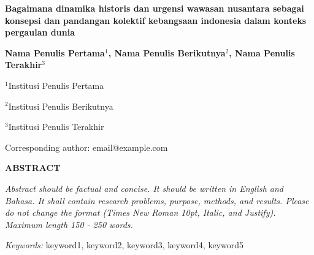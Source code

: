 \documentclass[12pt, a4paper]{article}
\newcommand{\makecustomsectiontitle}[1]{{\centering\normalfont\fontsize{11}{13}\selectfont\bfseries\MakeUppercase{#1}\par}\vspace{1em}\nopagebreak}
\begin{document}
\begin{titlepage}
    \centering
    {\fontsize{16}{19}\bfseries\selectfont Bagaimana dinamika historis dan urgensi wawasan nusantara sebagai konsepsi dan pandangan kolektif kebangsaan indonesia dalam konteks pergaulan dunia\par} %
    \vspace{1cm} %
    {\fontsize{11}{13}\bfseries\selectfont Nama Penulis Pertama$^1$, Nama Penulis Berikutnya$^2$, Nama Penulis Terakhir$^3$\par} %
    \vspace{0.5cm} %
    {\fontsize{10}{12}\selectfont $^1$Institusi Penulis Pertama\par} %
    {\fontsize{10}{12}\selectfont $^2$Institusi Penulis Berikutnya\par}
    {\fontsize{10}{12}\selectfont $^3$Institusi Penulis Terakhir\par}
    \vspace{0.3cm}
    {\fontsize{10}{12}\selectfont Corresponding author: email@example.com\par} %
\end{titlepage}
\clearpage
{} %

\makecustomsectiontitle{ABSTRACT}
\singlespacing %
\begin{justify}
\fontsize{10}{12}\selectfont\itshape
Abstract should be factual and concise. It should be written in English and Bahasa. It shall contain research problems, purpose, methods, and results. Please do not change the format (Times New Roman 10pt, Italic, and Justify). Maximum length 150 - 250 words.
\par\vspace{0.5em}
\textit{Keywords:} keyword1, keyword2, keyword3, keyword4, keyword5 %
\end{justify}
\onehalfspacing %
\vspace{1cm}
\end{document}
